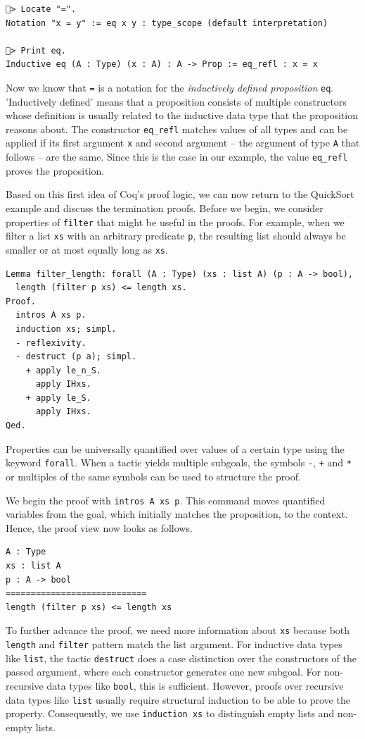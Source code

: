 \documentclass[a4paper, 11pt, fleqn, twoside, abstract=on]{scrreprt}
\newcommand{\cinl}[1]{\texttt{#1}}
\begin{document}
\begin{verbatim}
🐔> Locate "=".
Notation "x = y" := eq x y : type_scope (default interpretation)

🐔> Print eq.
Inductive eq (A : Type) (x : A) : A -> Prop := eq_refl : x = x
\end{verbatim}
\noindent
Now we know that \cinl{=} is a notation for the \textit{inductively defined proposition} \cinl{eq}.
'Inductively defined' means that a proposition consists of multiple constructors whose definition is usually related to the inductive data type that the proposition reasons about.
The constructor \cinl{eq_refl} matches values of all types and can be applied if its first argument \cinl{x} and second argument -- the argument of type \cinl{A} that follows -- are the same.
Since this is the case in our example, the value \cinl{eq_refl} proves the proposition.

Based on this first idea of Coq's proof logic, we can now return to the QuickSort example and discuss the termination proofs.
Before we begin, we consider properties of \cinl{filter} that might be useful in the proofs.
For example, when we filter a list \cinl{xs} with an arbitrary predicate \cinl{p}, the resulting list should always be smaller or at most equally long as \cinl{xs}.

\begin{verbatim}
Lemma filter_length: forall (A : Type) (xs : list A) (p : A -> bool),
  length (filter p xs) <= length xs.
Proof.
  intros A xs p.
  induction xs; simpl.
  - reflexivity.
  - destruct (p a); simpl.
    + apply le_n_S.
      apply IHxs.
    + apply le_S.
      apply IHxs.
Qed.
\end{verbatim}
\noindent
Properties can be universally quantified over values of a certain type using the keyword \cinl{forall}.
When a tactic yields multiple subgoals, the symbols \cinl{-}, \cinl{+} and \cinl{*} or multiples of the same symbols can be used to structure the proof.

We begin the proof with \cinl{intros A xs p}. 
This command moves quantified variables from the goal, which initially matches the proposition, to the context.
Hence, the proof view now looks as follows.

\begin{verbatim}
A : Type
xs : list A
p : A -> bool
============================
length (filter p xs) <= length xs
\end{verbatim}
\noindent
To further advance the proof, we need more information about \cinl{xs} because both \cinl{length} and \cinl{filter} pattern match the list argument.
For inductive data types like \cinl{list}, the tactic \cinl{destruct} does a case distinction over the constructors of the passed argument, where each constructor generates one new subgoal.
For non-recursive data types like \cinl{bool}, this is sufficient.
However, proofs over recursive data types like \cinl{list} usually require structural induction to be able to prove the property.
Consequently, we use \cinl{induction xs} to distinguish empty lists and non-empty lists.
\end{document}
